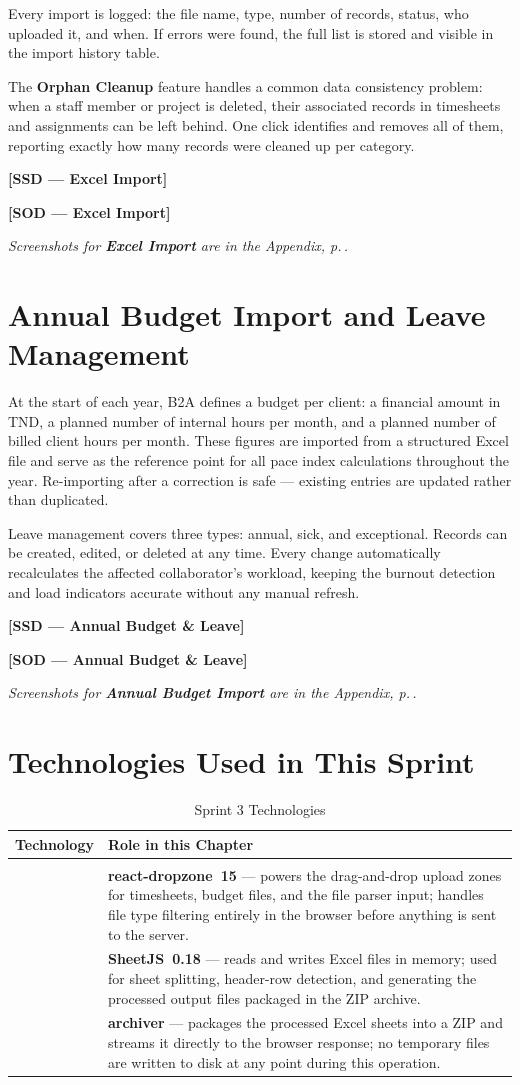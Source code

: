 \documentclass[12pt,a4paper]{report}
\newcommand{\ssd}[1]{\begin{placeholder}\textbf{[SSD --- #1]}\end{placeholder}\vspace{2pt}}
\newcommand{\sod}[1]{\begin{placeholder}\textbf{[SOD --- #1]}\end{placeholder}\vspace{4pt}}
\newcommand{\annexref}[1]{\begin{screenshotbox}\small\textit{Screenshots for \textbf{#1} are in the Appendix, p.\,\pageref{annex:#1}.}\end{screenshotbox}\vspace{4pt}}
\newcommand{\logoplace}[1]{%
  \begin{tikzpicture}[baseline=-0.5ex]
    \node[fill=logobg, draw=logoborder, rounded corners=4pt,
          inner xsep=6pt, inner ysep=4pt,
          minimum width=2.4cm, minimum height=0.75cm,
          font=\bfseries\footnotesize\color{accentgray}] {#1};
  \end{tikzpicture}%
}
\newenvironment{techtable}[2]{%
  \begin{longtable}{>{\centering\arraybackslash}p{2.6cm} p{11cm}}
  \caption{#1}\label{#2}\\
  \toprule\textbf{Technology} & \textbf{Role in this Chapter}\\\midrule\endhead
  \midrule\multicolumn{2}{r}{\small\itshape Continued\ldots}\\\endfoot
  \bottomrule\endlastfoot
}{%
  \end{longtable}%
}
\begin{document}
Every import is logged: the file name, type, number of records, status, who uploaded
it, and when. If errors were found, the full list is stored and visible in the import
history table.

The \textbf{Orphan Cleanup} feature handles a common data consistency problem: when
a staff member or project is deleted, their associated records in timesheets and
assignments can be left behind. One click identifies and removes all of them,
reporting exactly how many records were cleaned up per category.

\ssd{Excel Import}
\sod{Excel Import}
\annexref{Excel Import}

\section{Annual Budget Import and Leave Management}

At the start of each year, B2A defines a budget per client: a financial amount in
TND, a planned number of internal hours per month, and a planned number of billed
client hours per month. These figures are imported from a structured Excel file and
serve as the reference point for all pace index calculations throughout the year.
Re-importing after a correction is safe --- existing entries are updated rather than
duplicated.

Leave management covers three types: annual, sick, and exceptional. Records can be
created, edited, or deleted at any time. Every change automatically recalculates the
affected collaborator's workload, keeping the burnout detection and load indicators
accurate without any manual refresh.

\ssd{Annual Budget \& Leave}
\sod{Annual Budget \& Leave}
\annexref{Annual Budget Import}

\section{Technologies Used in This Sprint}

\begin{techtable}{Sprint 3 Technologies}{tab:tech-sprint3}

  \logoplace{react-dropzone} &
  \textbf{react-dropzone~15} --- powers the drag-and-drop upload zones for timesheets,
  budget files, and the file parser input; handles file type filtering entirely in
  the browser before anything is sent to the server.\\[6pt]

  \logoplace{SheetJS 0.18} &
  \textbf{SheetJS~0.18} --- reads and writes Excel files in memory; used for sheet
  splitting, header-row detection, and generating the processed output files packaged
  in the ZIP archive.\\[6pt]

  \logoplace{archiver} &
  \textbf{archiver} --- packages the processed Excel sheets into a ZIP and streams
  it directly to the browser response; no temporary files are written to disk at
  any point during this operation.\\

\end{techtable}
\end{document}
